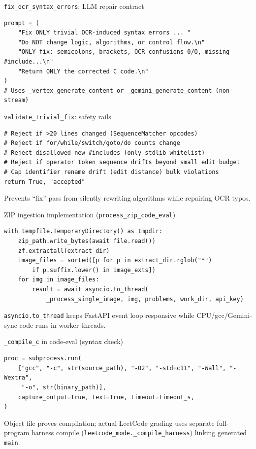 \documentclass[aspectratio=169]{beamer}
\begin{document}
\begin{frame}[fragile]{\texttt{fix\_ocr\_syntax\_errors}: LLM repair contract}
\begin{lstlisting}[style=py]
prompt = (
    "Fix ONLY trivial OCR-induced syntax errors ... "
    "Do NOT change logic, algorithms, or control flow.\n"
    "ONLY fix: semicolons, brackets, OCR confusions 0/O, missing #include...\n"
    "Return ONLY the corrected C code.\n"
)
# Uses _vertex_generate_content or _gemini_generate_content (non-stream)
\end{lstlisting}
\end{frame}

\begin{frame}[fragile]{\texttt{validate\_trivial\_fix}: safety rails}
\begin{lstlisting}[style=py]
# Reject if >20 lines changed (SequenceMatcher opcodes)
# Reject if for/while/switch/goto/do counts change
# Reject disallowed new #includes (only stdlib whitelist)
# Reject if operator token sequence drifts beyond small edit budget
# Cap identifier rename drift (edit distance) bulk violations
return True, "accepted"
\end{lstlisting}
\vfill
\tiny Prevents ``fix'' pass from silently rewriting algorithms while repairing OCR typos.
\end{frame}

\begin{frame}[fragile]{ZIP ingestion implementation (\texttt{process\_zip\_code\_eval})}
\begin{lstlisting}[style=py]
with tempfile.TemporaryDirectory() as tmpdir:
    zip_path.write_bytes(await file.read())
    zf.extractall(extract_dir)
    image_files = sorted([p for p in extract_dir.rglob("*")
        if p.suffix.lower() in image_exts])
    for img in image_files:
        result = await asyncio.to_thread(
            _process_single_image, img, problems, work_dir, api_key)
\end{lstlisting}
\vfill
\tiny \texttt{asyncio.to\_thread} keeps FastAPI event loop responsive while CPU/gcc/Gemini-sync code runs in worker threads.
\end{frame}

\begin{frame}[fragile]{\texttt{\_compile\_c} in code-eval (syntax check)}
\begin{lstlisting}[style=py]
proc = subprocess.run(
    ["gcc", "-c", str(source_path), "-O2", "-std=c11", "-Wall", "-Wextra",
     "-o", str(binary_path)],
    capture_output=True, text=True, timeout=timeout_s,
)
\end{lstlisting}
\vfill
\tiny Object file proves compilation; actual LeetCode grading uses separate full-program harness compile (\texttt{leetcode\_mode.\_compile\_harness}) linking generated \texttt{main}.
\end{frame}
\end{document}

